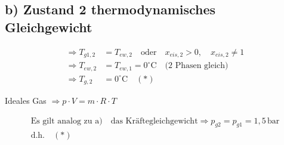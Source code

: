 \subsection*{b) Zustand 2 thermodynamisches Gleichgewicht}

\begin{align*}
    \Rightarrow T_{g1,2} &= T_{ew,2} \quad \text{oder} \quad x_{eis,2} > 0, \quad x_{eis,2} \neq 1 \\
    \Rightarrow T_{ew,2} &= T_{ew,1} = 0^\circ \text{C} \quad \text{(2 Phasen gleich)} \\
    \Rightarrow T_{g,2} &= 0^\circ \text{C} \quad (*)
\end{align*}

Ideales Gas $\Rightarrow p \cdot V = m \cdot R \cdot T$

\begin{align*}
    \text{Es gilt analog zu a)} \quad \text{das Kräftegleichgewicht} \Rightarrow p_{g2} = p_{g1} = 1,5 \, \text{bar} \\
    \text{d.h.} \quad (*)
\end{align*}